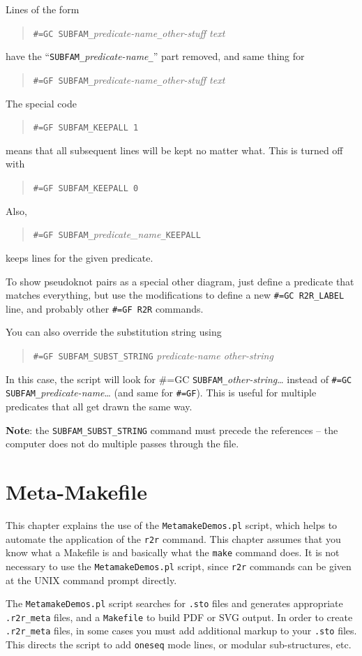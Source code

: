 \documentclass[letterpaper,12pt]{report}
\newcommand{\example}[1]{
\begin{quote}
{\raggedright
#1
}
\end{quote}
}
\begin{document}
Lines of the form 
\example{{\tt \#=GC
SUBFAM\_}\textit{predicate-name}{\tt \_}\textit{other-stuff  text }}
have the
{\textquotedblleft}{\tt SUBFAM\_}\textit{predicate-name}{\tt \_}{\textquotedblright}
part removed, and same thing for 
\example{{\tt \#=GF
SUBFAM\_}\textit{predicate-name}{\tt \_}{\it other-stuff  text}}

The special code

\example{{\tt \#=GF SUBFAM\_KEEPALL 1}}

means that all subsequent lines will be kept no matter what.  This is
turned off with

\example{{\tt \#=GF SUBFAM\_KEEPALL 0}}

Also,

\example{{\tt \#=GF SUBFAM\_}\textit{predicate\_name}{\tt \_KEEPALL}}

keeps lines for the given predicate.

To show pseudoknot pairs as a special other diagram, just define a
predicate that matches everything, but use the modifications to define
a new {\tt \#=GC R2R\_LABEL} line, and probably other {\tt \#=GF R2R} commands.

You can also override the substitution string using

\example{{\tt \#=GF SUBFAM\_SUBST\_STRING}  \textit{predicate-name other-string}}

In this case, the script will look for \#=GC
{\tt SUBFAM\_}\textit{other-string}{\dots} instead of {\tt \#=GC
SUBFAM\_}\textit{predicate-name}{\dots} (and same for {\tt \#=GF}).  This is
useful for multiple predicates that all get drawn the same way.  

{\bf Note}:
the {\tt SUBFAM\_SUBST\_STRING} command must precede the references -- the
computer does not do multiple passes through the file.

\chapter{Meta-Makefile}
\label{sec:metamake}

This chapter explains the use of the {\tt MetamakeDemos.pl} script, which helps to automate the application
of the {\tt r2r} command.
This chapter assumes that you know what a Makefile is and basically what the {\tt make} command does.
It is not necessary to use the {\tt MetamakeDemos.pl} script, since {\tt r2r} commands can be given at
the UNIX command prompt directly.

The {\tt MetamakeDemos.pl} script searches for {\tt .sto} files and generates appropriate {\tt .r2r\_meta}
files, and a {\tt Makefile} to build PDF or SVG output.
In order to create {\tt .r2r\_meta} files, in some cases you must add additional markup to your {\tt .sto} files.
This directs the script to add {\tt oneseq} mode lines, or modular sub-structures, etc.
\end{document}
